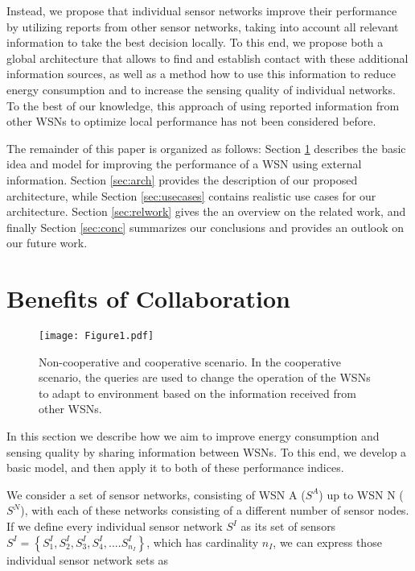 \documentclass[onecolumn]{jaise2e}
\begin{document}
Instead, we propose that individual sensor networks improve their performance by utilizing reports from other sensor networks, taking into account all relevant information to take the best decision locally. To this end, we propose both a global architecture that allows to find and establish contact with these additional information sources, as well as a method how to use this information to reduce energy consumption and to increase the sensing quality of individual networks. To the best of our knowledge, this approach of using reported information from other WSNs to optimize local performance has not been considered before.

The remainder of this paper is organized as follows: Section \ref{sec:benefits} describes the basic idea and model for improving the performance of a WSN using external information. Section \ref{sec:arch} provides the description of our proposed architecture, while Section \ref{sec:usecases} contains realistic use cases for our architecture. Section \ref{sec:relwork} gives the an overview on the related work, and finally Section \ref{sec:conc} summarizes our conclusions and provides an outlook on our future work.



\section{Benefits of Collaboration}\label{sec:benefits}

\begin{figure*}[t]
\centering
\texttt{[image: Figure1.pdf]}  
\caption{Non-cooperative and cooperative scenario. In the cooperative scenario, the queries are used to change the operation of the WSNs to adapt to environment based on the information received from other WSNs.}
\label{fig:Scenario}
\end{figure*}


In this section we describe how we aim to improve energy consumption and sensing quality by sharing information between WSNs. To this end, we develop a basic model, and then apply it to both of these performance indices.

We consider a set of sensor networks, consisting of WSN A ($S^A$) up to WSN N ($S^N$), with each of these networks consisting of a different number of sensor nodes. If we define every individual sensor network $S^I$ as its set of sensors $S^I = \left\{S^I_1, S^I_2, S^I_3, S^I_4, ....S^I_{n_I}\right\}$, which has cardinality $n_I$, we can express those individual sensor network sets as 
\end{document}
